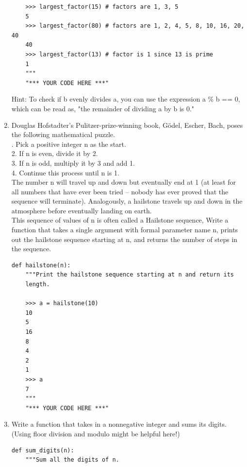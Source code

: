 \documentclass[11pt]{article}
\begin{document}
\begin{enumerate}[leftmargin = *]
\begin{lstlisting}
    >>> largest_factor(15) # factors are 1, 3, 5
    5
    >>> largest_factor(80) # factors are 1, 2, 4, 5, 8, 10, 16, 20, 40
    40
    >>> largest_factor(13) # factor is 1 since 13 is prime
    1
    """
    "*** YOUR CODE HERE ***"
\end{lstlisting}
Hint: To check if b evenly divides a, you can use the expression a \% b == 0, which can be read as, "the remainder of dividing a by b is 0."
\item Douglas Hofstadter's Pulitzer-prize-winning book, Gödel, Escher, Bach, poses the following mathematical puzzle. \\
. Pick a positive integer n as the start. \\
2. If n is even, divide it by 2. \\
3. If n is odd, multiply it by 3 and add 1. \\
4. Continue this process until n is 1. \\
\newline
The number n will travel up and down but eventually end at 1 (at least for all numbers that have ever been tried -- nobody has ever proved that the sequence will terminate). Analogously, a hailstone travels up and down in the atmosphere before eventually landing on earth. \\
\newline
This sequence of values of n is often called a Hailstone sequence, Write a function that takes a single argument with formal parameter name n, prints out the hailstone sequence starting at n, and returns the number of steps in the sequence. 
\begin{lstlisting}
def hailstone(n):
    """Print the hailstone sequence starting at n and return its
    length.

    >>> a = hailstone(10)
    10
    5
    16
    8
    4
    2
    1
    >>> a
    7
    """
    "*** YOUR CODE HERE ***" 
\end{lstlisting}
\item Write a function that takes in a nonnegative integer and sums its digits. (Using floor division and modulo might be helpful here!)
\begin{lstlisting}
def sum_digits(n):
    """Sum all the digits of n.


\end{lstlisting}
\end{enumerate}
\end{document}
